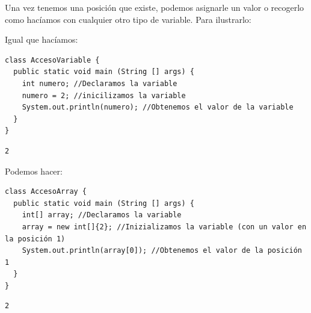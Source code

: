 \documentclass[11pt]{article}
\begin{document}
Una vez tenemos una posición que existe, podemos asignarle un valor o recogerlo como hacíamos con cualquier otro tipo de variable. Para ilustrarlo:

Igual que hacíamos:

\begin{verbatim}
class AccesoVariable {
  public static void main (String [] args) {
    int numero; //Declaramos la variable
    numero = 2; //inicilizamos la variable
    System.out.println(numero); //Obtenemos el valor de la variable
  }
}
\end{verbatim}

\begin{verbatim}
2
\end{verbatim}

Podemos hacer:

\begin{verbatim}
class AccesoArray {
  public static void main (String [] args) {
    int[] array; //Declaramos la variable
    array = new int[]{2}; //Inizializamos la variable (con un valor en la posición 1)
    System.out.println(array[0]); //Obtenemos el valor de la posición 1
  }
}

\end{verbatim}

\begin{verbatim}
2
\end{verbatim}
\end{document}
